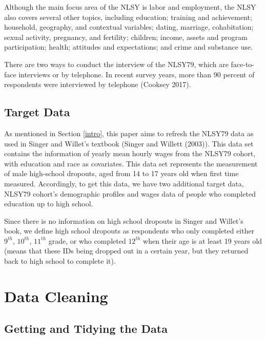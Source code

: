 \documentclass[12pt]{article}
\begin{document}
Although the main focus area of the NLSY is labor and employment, the NLSY also covers several other topics, including education; training and achievement; household, geography, and contextual variables; dating, marriage, cohabitation; sexual activity, pregnancy, and fertility; children; income, assets and program participation; health; attitudes and expectations; and crime and substance use.

There are two ways to conduct the interview of the NLSY79, which are face-to-face interviews or by telephone. In recent survey years, more than 90 percent of respondents were interviewed by telephone (Cooksey 2017).

\hypertarget{target-data}{%
\subsection{Target Data}\label{target-data}}

As mentioned in Section \ref{intro}, this paper aims to refresh the NLSY79 data as used in Singer and Willet's textbook (Singer and Willett (2003)). This data set contains the information of yearly mean hourly wages from the NLSY79 cohort, with education and race as covariates. This data set represents the measurement of male high-school dropouts, aged from 14 to 17 years old when first time measured. Accordingly, to get this data, we have two additional target data, NLSY79 cohort's demographic profiles and wages data of people who completed education up to high school.

Since there is no information on high school dropouts in Singer and Willet's book, we define high school dropouts as respondents who only completed either \(9^{th}\), \(10^{th}\), \(11^{th}\) grade, or who completed \(12^{th}\) when their age is at least 19 years old (means that these IDs being dropped out in a certain year, but they returned back to high school to complete it).

\hypertarget{cleaning}{%
\section{Data Cleaning}\label{cleaning}}

\hypertarget{getting-and-tidying-the-data}{%
\subsection{Getting and Tidying the Data}\label{getting-and-tidying-the-data}}
\end{document}
